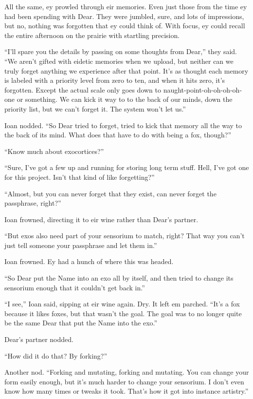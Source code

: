 All the same, ey prowled through eir memories. Even just those from the time ey had been spending with Dear. They were jumbled, sure, and lots of impressions, but no, nothing was forgotten that ey could think of. With focus, ey could recall the entire afternoon on the prairie with startling precision.

``I'll spare you the details by passing on some thoughts from Dear,'' they said. ``We aren't gifted with eidetic memories when we upload, but neither can we truly forget anything we experience after that point. It's as thought each memory is labeled with a priority level from zero to ten, and when it hits zero, it's forgotten. Except the actual scale only goes down to naught-point-oh-oh-oh-oh-one or something. We can kick it way to to the back of our minds, down the priority list, but we can't forget it. The system won't let us.''

Ioan nodded. ``So Dear tried to forget, tried to kick that memory all the way to the back of its mind. What does that have to do with being a fox, though?''

``Know much about exocortices?''

``Sure, I've got a few up and running for storing long term stuff. Hell, I've got one for this project. Isn't that kind of like forgetting?''

``Almost, but you can never forget that they exist, can never forget the passphrase, right?''

Ioan frowned, directing it to eir wine rather than Dear's partner.

``But exos also need part of your sensorium to match, right? That way you can't just tell someone your passphrase and let them in.''

Ioan frowned. Ey had a hunch of where this was headed.

``So Dear put the Name into an exo all by itself, and then tried to change its sensorium enough that it couldn't get back in.''

``I see,'' Ioan said, sipping at eir wine again. Dry. It left em parched. ``It's a fox because it likes foxes, but that wasn't the goal. The goal was to no longer quite be the same Dear that put the Name into the exo.''

Dear's partner nodded.

``How did it do that? By forking?''

Another nod. ``Forking and mutating, forking and mutating. You can change your form easily enough, but it's much harder to change your sensorium. I don't even know how many times or tweaks it took. That's how it got into instance artistry.''

